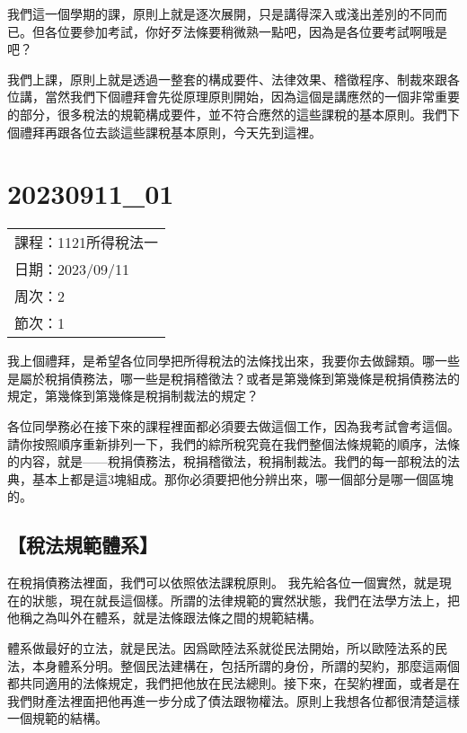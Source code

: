 \documentclass[]{ctexbook}
\begin{document}
我們這一個學期的課，原則上就是逐次展開，只是講得深入或淺出差別的不同而已。但各位要參加考試，你好歹法條要稍微熟一點吧，因為是各位要考試啊哦是吧？

我們上課，原則上就是透過一整套的構成要件、法律效果、稽徵程序、制裁來跟各位講，當然我們下個禮拜會先從原理原則開始，因為這個是講應然的一個非常重要的部分，很多稅法的規範構成要件，並不符合應然的這些課稅的基本原則。我們下個禮拜再跟各位去談這些課稅基本原則，今天先到這裡。

\hypertarget{section-2}{%
\chapter{20230911\_01}\label{section-2}}

\begin{longtable}[]{@{}l@{}}
\toprule()
\endhead
課程：1121所得稅法一 \\
日期：2023/09/11 \\
周次：2 \\
節次：1 \\
\bottomrule()
\end{longtable}

我上個禮拜，是希望各位同學把所得稅法的法條找出來，我要你去做歸類。哪一些是屬於稅捐債務法，哪一些是稅捐稽徵法？或者是第幾條到第幾條是稅捐債務法的規定，第幾條到第幾條是稅捐制裁法的規定？

各位同學務必在接下來的課程裡面都必須要去做這個工作，因為我考試會考這個。請你按照順序重新排列一下，我們的綜所稅究竟在我們整個法條規範的順序，法條的内容，就是------稅捐債務法，稅捐稽徵法，稅捐制裁法。我們的每一部稅法的法典，基本上都是這3塊組成。那你必須要把他分辨出來，哪一個部分是哪一個區塊的。

\hypertarget{ux7a05ux6cd5ux898fux7bc4ux9ad4ux7cfb}{%
\section{【稅法規範體系】}\label{ux7a05ux6cd5ux898fux7bc4ux9ad4ux7cfb}}

在稅捐債務法裡面，我們可以依照依法課稅原則。
我先給各位一個實然，就是現在的狀態，現在就長這個樣。所謂的法律規範的實然狀態，我們在法學方法上，把他稱之為叫外在體系，就是法條跟法條之間的規範結構。

體系做最好的立法，就是民法。因爲歐陸法系就從民法開始，所以歐陸法系的民法，本身體系分明。整個民法建構在，包括所謂的身份，所謂的契約，那麼這兩個都共同適用的法條規定，我們把他放在民法總則。接下來，在契約裡面，或者是在我們財產法裡面把他再進一步分成了債法跟物權法。原則上我想各位都很清楚這樣一個規範的結構。
\end{document}

